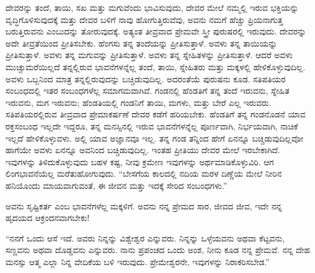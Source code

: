 ದೇವರನ್ನು ತಂದೆ, ತಾಯಿ, ಸಖ ಮತ್ತು ಮಗುವೆಂದು ಭಾವಿಸುವುದು, ದೇವರ ಮೇಲೆ ನಮ್ಮಲ್ಲಿ ಇರುವ ಭಕ್ತಿಯನ್ನು ವೃದ್ಧಿಗೊಳಿಸುವುದಕ್ಕೆ ಮತ್ತು ದೇವರ ಬಳಿಗೆ ನಾವು ಹೋಗುತ್ತಿರುವೆವು, ಅವನು ನಮಗೆ ಹೆಚ್ಚು ಪ್ರಿಯನಾಗುತ್ತ ಬರುತ್ತಿರುವನು ಎಂಬುದನ್ನು ತೋರುವುದಕ್ಕೆ. ಅತ್ಯಂತ ತೀವ್ರವಾದ ಪ್ರೇಮವೇ ಸ್ತ್ರೀ ಪುರುಷರಲ್ಲಿ ಇರುವುದು. ದೇವರನ್ನು ಅದೇ ತೀವ್ರತೆಯಿಂದ ಪ್ರೀತಿಸಬೇಕು. ಹೆಂಗಸು ತನ್ನ ತಂದೆಯನ್ನು ಪ್ರೀತಿಸುತ್ತಾಳೆ. ಅವಳು ತನ್ನ ತಾಯಿಯನ್ನು ಪ್ರೀತಿಸುತ್ತಾಳೆ. ಅವಳು ತನ್ನ ಮಗುವನ್ನು ಪ್ರೀತಿಸುತ್ತಾಳೆ. ಅವಳು ತನ್ನ ಸ್ನೇಹಿತಳನ್ನು ಪ್ರೀತಿಸುತ್ತಾಳೆ. ಆದರೆ ಅವಳು ಮುಚ್ಚುಮರೆಯಿಲ್ಲದೆ ತನ್ನಲ್ಲಿರುವ ಭಾವನೆಗಳನ್ನೆಲ್ಲ ತಂದೆ, ತಾಯಿ, ಸ್ನೇಹಿತರು ಮತ್ತು ಮಕ್ಕಳಲ್ಲಿ ಹೇಳಿಕೊಳ್ಳುವುದಿಲ್ಲ. ಅವಳು ಒಬ್ಬನಿಂದ ಮಾತ್ರ ತನ್ನಲ್ಲಿರುವುದನ್ನು ಬಚ್ಚಿಡುವುದಿಲ್ಲ. ಅದರಂತೆಯೆ ಪುರುಷನು ಕೂಡ. ಸತಿಪತಿಯರ ಸಂಬಂಧದಲ್ಲಿ ಇತರ ಸಂಬಂಧಗಳೆಲ್ಲ ಸಮಾಗಮವಾಗಿವೆ. ಗಂಡನಲ್ಲಿ ಹೆಂಡತಿಗೆ ತನ್ನ ತಂದೆ ಇರುವನು, ಸ್ನೇಹಿತ ಇರುವನು, ಮಗ ಇರುವನು; ಹೆಂಡತಿಯಲ್ಲಿ ಗಂಡನಿಗೆ ತಾಯಿ, ಮಗಳು, ಮತ್ತು ಬೇರೆ ಎಲ್ಲ ಇರುವರು. ಸತಿಪತಿಯರಲ್ಲಿರುವ ತೀವ್ರವಾದ ಪ್ರೇಮಾಕರ್ಷಣೆ ದೇವರ ಕಡೆಗೆ ಹರಿಯಬೇಕು. ಹೆಂಡತಿಗೆ ತನ್ನ ಗಂಡನೊಡನೆ ಯಾವ ರಕ್ತಸಂಬಂಧ ಇಲ್ಲದೇ ಇದ್ದರೂ, ತನ್ನ ಮನಸ್ಸಿನಲ್ಲಿ ಇರುವ ಭಾವನೆಗಳನ್ನೆಲ್ಲ ಪೂರ್ಣವಾಗಿ, ನಿರ್ಭಯವಾಗಿ, ನಾಚಿಕೆ ಇಲ್ಲದೆ ಹೇಳಿಕೊಳ್ಳುವಳು. ಅಲ್ಲಿ ಯಾವ ಅಜ್ಞಾನವೂ ಇಲ್ಲ. ತನ್ನ ಗಂಡ ತನ್ನಿಂದ ಹೇಗೆ ಏನನ್ನೂ ಬಚ್ಚಿಡುವುದಿಲ್ಲವೋ ಹಾಗೆಯೇ ಅವಳು ಏನನ್ನೂ ಅವನಿಂದ ಬಚ್ಚಿಡುವುದಿಲ್ಲ. ಇಂತಹ ಪ್ರೀತಿಯು ದೇವರ ಮೇಲೆ ಇರಬೇಕಾಗಿದೆ. ಇವುಗಳನ್ನು ತಿಳಿದುಕೊಳ್ಳುವುದು ಬಹಳ ಕಷ್ಟ, ನೀವು ಕ್ರಮೇಣ ಇವುಗಳನ್ನು ಅರ್ಥಮಾಡಿಕೊಳ್ಳುವಿರಿ. ಆಗ ಲಿಂಗಭಾವನೆಯೆಲ್ಲ ಮರೆತುಹೋಗುವುದು. “ಬೇಸಗೆಯ ಕಾಲದಲ್ಲಿ ನದಿಯ ಮರಳ ದಿಣ್ಣೆಯ ಮೇಲೆ ನೀರಿನ ಹನಿಯೊಂದು ಮಾಯವಾಗುವಂತೆ, ಈ ಜೀವನ ಮತ್ತು ಇದಕ್ಕೆ ಸೇರಿದ ಸಂಬಂಧಗಳು.”

\vskip 2pt

ಅವನು ಸೃಷ್ಟಿಕರ್ತ ಎಂಬ ಭಾವನೆಗಳೆಲ್ಲ ಮಕ್ಕಳಿಗೆ. ಅವನು ನನ್ನ ಪ್ರೇಮದ ಸಾರ, ಜೀವದ ಜೀವ, ಇದೇ ನನ್ನ ಹೃದಯದ ಆಕ್ರಂದನವಾಗಬೇಕು!

“ನನಗೆ ಒಂದು ಆಸೆ ಇದೆ. ಅವರು ನಿನ್ನನ್ನು ವಿಶ್ವೇಶ್ವರ ಎನ್ನುವರು. ನಿನ್ನನ್ನು ಒಳ್ಳೆಯವನು ಅಥವಾ ಕೆಟ್ಟವನು, ಸಣ್ಣವನು ಅಥವಾ ದೊಡ್ಡವನು ಎನ್ನುವರು. ನಾನು ಪ್ರಪಂಚದ ಒಂದು ಅಂಶ, ನೀನು ಕೂಡ ನನ್ನ ಪ್ರೇಮವೆ. ನನ್ನ ದೇಹ ಮನಸ್ಸು ಆತ್ಮ ಎಲ್ಲಾ ನಿನ್ನ ವೇದಿಕೆಯ ಬಳಿ ಇರುವುದು. ಪ್ರೇಮೇಶ್ವರನೇ, ಇವುಗಳನ್ನು ನಿರಾಕರಿಸಬೇಡ.''

